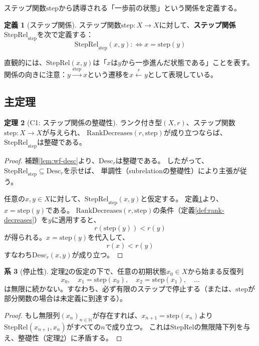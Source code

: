 \documentclass[11pt,a4paper]{ltjsarticle}
\theoremstyle{definition}
\newtheorem{definition}{定義}[section]
\newtheorem{theorem}[definition]{定理}
\newtheorem{corollary}[definition]{系}
\begin{document}
ステップ関数$\mathrm{step}$から誘導される「一歩前の状態」という関係を定義する。

\begin{definition}[ステップ関係]
\label{def:step-rel}
ステップ関数$\mathrm{step}: X \to X$に対して、\textbf{ステップ関係}$\mathrm{StepRel}_{\mathrm{step}}$を次で定義する：
\[
\mathrm{StepRel}_{\mathrm{step}}(x, y) :\!\!\iff x = \mathrm{step}(y)
\]
\end{definition}

直観的には、$\mathrm{StepRel}(x, y)$は「$x$は$y$から一歩進んだ状態である」ことを表す。
関係の向きに注意：$y \xrightarrow{\mathrm{step}} x$という遷移を$x \xleftarrow{r} y$として表現している。

\subsection{主定理}

\begin{theorem}[C1: ステップ関係の整礎性]
\label{thm:main-c1}
ランク付き型$(X, r)$、ステップ関数$\mathrm{step}: X \to X$が与えられ、
$\mathrm{RankDecreases}(r, \mathrm{step})$が成り立つならば、
$\mathrm{StepRel}_{\mathrm{step}}$は整礎である。
\end{theorem}

\begin{proof}
補題\ref{lem:wf-desc}より、$\mathrm{Desc}_r$は整礎である。
したがって、$\mathrm{StepRel}_{\mathrm{step}} \subseteq \mathrm{Desc}_r$を示せば、
単調性（subrelationの整礎性）により主張が従う。

任意の$x, y \in X$に対して、$\mathrm{StepRel}_{\mathrm{step}}(x, y)$と仮定する。
定義\ref{def:step-rel}より、$x = \mathrm{step}(y)$である。
$\mathrm{RankDecreases}(r, \mathrm{step})$の条件（定義\ref{def:rank-decreases}）を$y$に適用すると、
\[
r(\mathrm{step}(y)) < r(y)
\]
が得られる。$x = \mathrm{step}(y)$を代入して、
\[
r(x) < r(y)
\]
すなわち$\mathrm{Desc}_r(x, y)$が成り立つ。
\end{proof}

\begin{corollary}[停止性]
\label{cor:termination}
定理\ref{thm:main-c1}の仮定の下で、任意の初期状態$x_0 \in X$から始まる反復列
\[
x_0, \quad x_1 = \mathrm{step}(x_0), \quad x_2 = \mathrm{step}(x_1), \quad \ldots
\]
は無限に続かない。すなわち、必ず有限のステップで停止する（または、$\mathrm{step}$が部分関数の場合は未定義に到達する）。
\end{corollary}

\begin{proof}
もし無限列$(x_n)_{n \in \mathbb{N}}$が存在すれば、$x_{n+1} = \mathrm{step}(x_n)$より
$\mathrm{StepRel}(x_{n+1}, x_n)$がすべての$n$で成り立つ。
これは$\mathrm{StepRel}$の無限降下列を与え、整礎性（定理\ref{thm:main-c1}）に矛盾する。
\end{proof}
\end{document}
